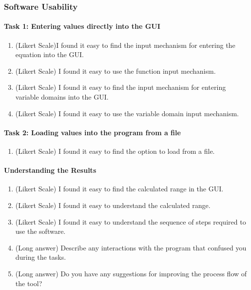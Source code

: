 \documentclass[12pt, titlepage]{article}
\begin{document}
\subsubsection{Software Usability}
\paragraph{Task 1: Entering values directly into the GUI}
\begin{enumerate}
	\item (Likert Scale)I found it easy to find the input mechanism for 
	entering 
	the equation into the GUI.
	
	\item (Likert Scale) I found it easy to use the function input mechanism.
	
	\item (Likert Scale) I found it easy to find the input mechanism for 
	entering variable domains into the GUI. 
	
	\item (Likert Scale) I found it easy to use the variable domain input 
	mechanism. 
\end{enumerate}

\paragraph{Task 2: Loading values into the program from a file}
\begin{enumerate}
	\item (Likert Scale) I found it easy to find the option to load from a file.
\end{enumerate}

\paragraph{Understanding the Results}
\begin{enumerate}
	\item (Likert Scale) I found it easy to find the calculated range in the 
	GUI.
	
	\item (Likert Scale) I found it easy to understand the calculated range. 
	
	\item (Likert Scale) I found it easy to understand the sequence of steps 
	required to use the software. 
	
	\item (Long answer) Describe any interactions with the program that 
	confused you during the tasks.
	
	\item (Long answer)  Do you have any suggestions for improving the process 
	flow of the tool?
\end{enumerate}
\end{document}
